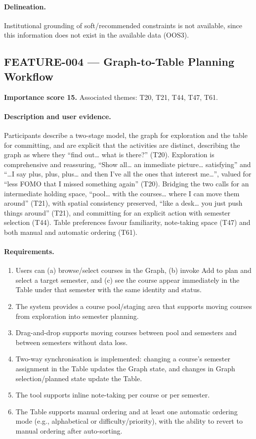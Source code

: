\paragraph{Delineation.}
Institutional grounding of soft/recommended constraints is not available, since this information does not exist in the available data (OOS3).

\subsection{FEATURE-004 --- Graph-to-Table Planning Workflow}
\label{feat:004}
\textbf{Importance score 15.} Associated themes: T20, T21, T44, T47, T61.

\paragraph{Description and user evidence.}
Participants describe a two-stage model, the graph for exploration and the table for committing, and are explicit that the activities are distinct, describing the graph as where they \enquote{find out… what is there?} (T20). Exploration is comprehensive and reassuring, \enquote{Show all… an immediate picture… satisfying} and \enquote{…I say plus, plus, plus… and then I've all the ones that interest me…}, valued for \enquote{less FOMO that I missed something again} (T20). Bridging the two calls for an intermediate holding space, \enquote{pool… with the courses… where I can move them around} (T21), with spatial consistency preserved, \enquote{like a desk… you just push things around} (T21), and committing for an explicit action with semester selection (T44). Table preferences favour familiarity, note-taking space (T47) and both manual and automatic ordering (T61).

\paragraph{Requirements.}
\begin{enumerate}
    \item Users can (a) browse/select courses in the Graph, (b) invoke Add to plan and select a target semester, and (c) see the course appear immediately in the Table under that semester with the same identity and status.
    \item The system provides a course pool/staging area that supports moving courses from exploration into semester planning.
    \item Drag-and-drop supports moving courses between pool and semesters and between semesters without data loss.
    \item Two-way synchronisation is implemented: changing a course's semester assignment in the Table updates the Graph state, and changes in Graph selection/planned state update the Table.
    \item The tool supports inline note-taking per course or per semester.
    \item The Table supports manual ordering and at least one automatic ordering mode (e.g., alphabetical or difficulty/priority), with the ability to revert to manual ordering after auto-sorting.
\end{enumerate}


